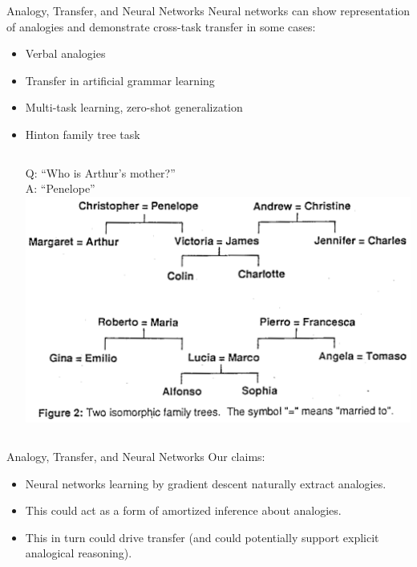 \documentclass{beamer}
\begin{document}
\begin{frame}{Analogy, Transfer, and Neural Networks}
Neural networks can show representation of analogies and demonstrate cross-task transfer in some cases: 
\begin{itemize}
    \item<2-> Verbal analogies \cite{Kollias2013}
    \item<3-> Transfer in artificial grammar learning \cite{Dienes1999}
    \item<3-> Multi-task learning, zero-shot generalization \cite{Luong2016,Johnson2016}  
    \item<4-> Hinton family tree task \cite{Hinton1986}
    \begin{columns}
     Q: ``Who is Arthur's mother?'' \\ A: ``Penelope'' %
	\includegraphics[width = \textwidth]{../writing/cogsci_2017/figures/hinton_family_tree_figure.png}
    \end{columns}
\end{itemize}
\end{frame}

\begin{frame}{Analogy, Transfer, and Neural Networks}
Our claims:
\begin{itemize}
    \item<1-> Neural networks learning by gradient descent naturally extract analogies. 
    \item<2-> This could act as a form of amortized inference about analogies.
    \item<3-> This in turn could drive transfer (and could potentially support explicit analogical reasoning).
\end{itemize}
\end{frame}
\end{document}
